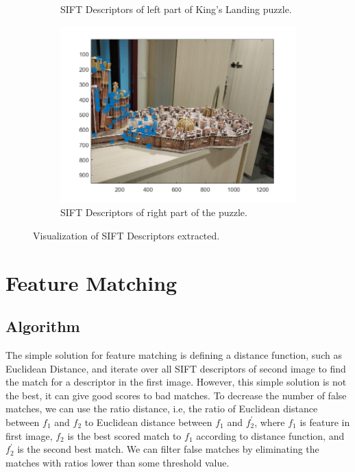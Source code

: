\documentclass{article}
\begin{document}
\begin{figure}[!htb]
\begin{subfigure}{.5\textwidth}
  \caption{SIFT Descriptors of left part of King's Landing puzzle.}
\end{subfigure}%
\begin{subfigure}{.5\textwidth}
  \centering
  \includegraphics[width=.99\textwidth]{got2_sift.png}
  \caption{SIFT Descriptors of right part of the puzzle.}
\end{subfigure}
\caption{Visualization of SIFT Descriptors extracted.}
\end{figure}


\newpage

\section{Feature Matching}

\subsection{Algorithm}
The simple solution for feature matching is defining a distance function, such as Euclidean Distance, and iterate over all SIFT descriptors of second image to find the match for a descriptor in the first image. However, this simple solution is not the best, it can give good scores to bad matches. To decrease the number of false matches, we can use the ratio distance, i.e, the ratio of Euclidean distance between $f_{1}$ and $ f_{2}$ to Euclidean distance between $f_{1}$ and $f_{2}^{'} $, where $f_{1}$ is feature in first image,  $f_{2}$ is the best scored match to  $f_{1}$ according to distance function, and  $f_{2}^{'}$ is the second best match. We can filter false matches by eliminating the matches with ratios lower than some threshold value.
\end{document}
